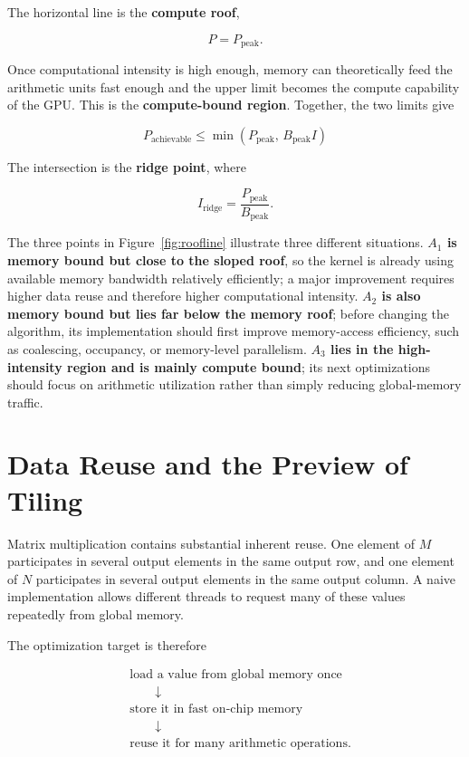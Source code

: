 \documentclass[11pt,a4paper]{article}
\begin{document}
The horizontal line is the \textbf{compute roof},

\[
    P = P_{\text{peak}}.
\]

Once computational intensity is high enough, memory can theoretically feed the arithmetic units fast enough and the upper limit becomes the compute capability of the GPU. This is the \textbf{compute-bound region}. Together, the two limits give

\[
\boxed{
    P_{\text{achievable}}
    \leq
    \min\!\left(P_{\text{peak}},\,B_{\text{peak}}I\right)
}
\]

The intersection is the \textbf{ridge point}, where

\[
    I_{\text{ridge}}
    =
    \frac{P_{\text{peak}}}{B_{\text{peak}}}.
\]

The three points in Figure~\ref{fig:roofline} illustrate three different situations. \textbf{$A_1$ is memory bound but close to the sloped roof}, so the kernel is already using available memory bandwidth relatively efficiently; a major improvement requires higher data reuse and therefore higher computational intensity. \textbf{$A_2$ is also memory bound but lies far below the memory roof}; before changing the algorithm, its implementation should first improve memory-access efficiency, such as coalescing, occupancy, or memory-level parallelism. \textbf{$A_3$ lies in the high-intensity region and is mainly compute bound}; its next optimizations should focus on arithmetic utilization rather than simply reducing global-memory traffic.

\section{Data Reuse and the Preview of Tiling}

Matrix multiplication contains substantial inherent reuse. One element of $M$ participates in several output elements in the same output row, and one element of $N$ participates in several output elements in the same output column. A naive implementation allows different threads to request many of these values repeatedly from global memory.

The optimization target is therefore

\[
\begin{aligned}
&\text{load a value from global memory once} \\
&\qquad\downarrow \\
&\text{store it in fast on-chip memory} \\
&\qquad\downarrow \\
&\text{reuse it for many arithmetic operations}.
\end{aligned}
\]
\end{document}
